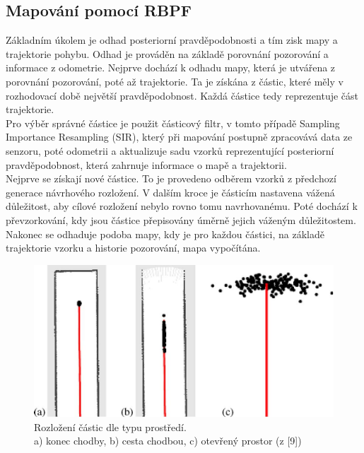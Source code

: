 \documentclass[12pt]{report}
\begin{document}
\subsection{Mapování pomocí RBPF}
Základním úkolem je odhad posteriorní pravděpodobnosti a tím zisk mapy a trajektorie pohybu. Odhad je prováděn na základě porovnání pozorování a informace z odometrie. Nejprve dochází k odhadu mapy, která je utvářena z porovnání pozorování, poté až trajektorie. Ta je získána z částic, které měly v rozhodovací době největší pravděpodobnost. Každá částice tedy reprezentuje část trajektorie.\\
\indent Pro výběr správné částice je použit částicový filtr, v tomto případě Sampling Importance Resampling (SIR), který při mapování postupně zpracovává data ze senzoru, poté odometrii a aktualizuje sadu vzorků reprezentující posteriorní pravděpodobnost, která zahrnuje informace o mapě a trajektorii. \\
\indent Nejprve se získají nové částice. To je provedeno odběrem vzorků z předchozí generace návrhového rozložení. V dalším kroce je částicím nastavena vážená důležitost, aby cílové rozložení nebylo rovno tomu navrhovanému. Poté dochází k převzorkování, kdy jsou částice přepisovány úměrně jejich váženým důležitostem. Nakonec se odhaduje podoba mapy, kdy je pro každou částici, na základě trajektorie vzorku a historie pozorování, mapa vypočítána.

\begin{figure}[!ht]
	\begin{center}
		\includegraphics[width=0.7\columnwidth]{imgs/gmapping_particles.pdf}
	\end{center}
	\caption{Rozložení částic dle typu prostředí.\\
	a) konec chodby, b) cesta chodbou, c) otevřený prostor (z [9])}
	\label{fig:gmapping_particles}
\end{figure}
\end{document}
